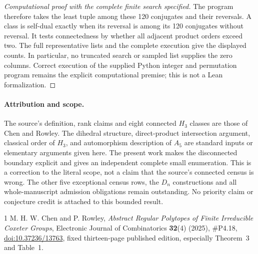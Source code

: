 \documentclass[11pt,a4paper]{article}
\begin{document}
\begin{proof}[Computational proof with the complete finite search specified]
The program therefore takes the least tuple among these 120 conjugates
and their reversals. A class is self-dual exactly when its reversal is
among its 120 conjugates without reversal. It tests connectedness by
whether all adjacent product orders exceed two. The full representative
lists and the complete execution give the displayed counts. In particular,
no truncated search or sampled list supplies the zero columns. Correct
execution of the supplied Python integer and permutation program remains
the explicit computational premise; this is not a Lean formalization.
\end{proof}

\paragraph{Attribution and scope.}
The source's definition, rank claims and eight connected $H_3$ classes are
those of Chen and Rowley. The dihedral structure, direct-product intersection
argument, classical order of $H_3$, and automorphism description of $A_5$
are standard inputs or elementary arguments given here. The present work
makes the disconnected boundary explicit and gives an independent complete
small enumeration. This is a correction to the literal scope, not a claim
that the source's connected census is wrong. The other five exceptional
census rows, the $D_n$ constructions and all whole-manuscript admission
obligations remain outstanding. No priority claim or conjecture credit is
attached to this bounded result.

\begin{thebibliography}{1}
 M. H. W. Chen and P. Rowley,
\emph{Abstract Regular Polytopes of Finite Irreducible Coxeter Groups},
Electronic Journal of Combinatorics \textbf{32}(4) (2025), \#P4.18,
\href{https://doi.org/10.37236/13763}{doi:10.37236/13763},
fixed thirteen-page published edition, especially Theorem~3 and Table~1.
\end{thebibliography}
\end{document}
